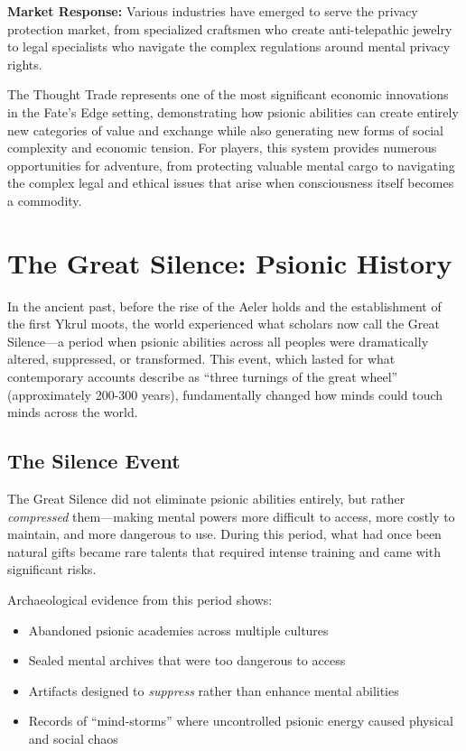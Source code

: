 \documentclass[11pt,twoside]{article}
\begin{document}
\textbf{Market Response:} Various industries have emerged to serve the privacy protection market, from specialized craftsmen who create anti-telepathic jewelry to legal specialists who navigate the complex regulations around mental privacy rights.

The Thought Trade represents one of the most significant economic innovations in the Fate's Edge setting, demonstrating how psionic abilities can create entirely new categories of value and exchange while also generating new forms of social complexity and economic tension. For players, this system provides numerous opportunities for adventure, from protecting valuable mental cargo to navigating the complex legal and ethical issues that arise when consciousness itself becomes a commodity.

\section{The Great Silence: Psionic History}

In the ancient past, before the rise of the Aeler holds and the establishment of the first Ykrul moots, the world experienced what scholars now call the Great Silence---a period when psionic abilities across all peoples were dramatically altered, suppressed, or transformed. This event, which lasted for what contemporary accounts describe as ``three turnings of the great wheel'' (approximately 200-300 years), fundamentally changed how minds could touch minds across the world.

\subsection{The Silence Event}

The Great Silence did not eliminate psionic abilities entirely, but rather \textit{compressed} them---making mental powers more difficult to access, more costly to maintain, and more dangerous to use. During this period, what had once been natural gifts became rare talents that required intense training and came with significant risks.

Archaeological evidence from this period shows:
\begin{itemize}
    \item Abandoned psionic academies across multiple cultures
    \item Sealed mental archives that were too dangerous to access
    \item Artifacts designed to \textit{suppress} rather than enhance mental abilities
    \item Records of ``mind-storms'' where uncontrolled psionic energy caused physical and social chaos
\end{itemize}
\end{document}
